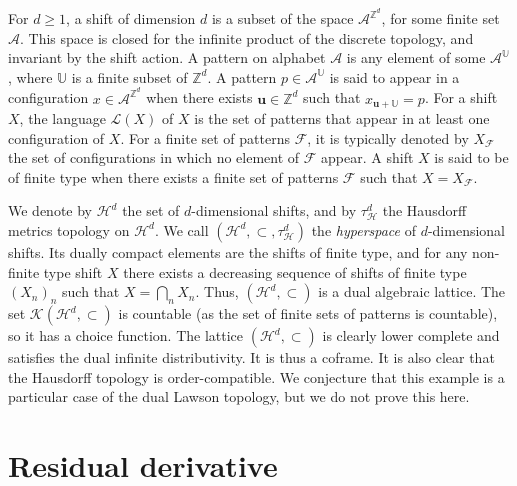 \documentclass{article}
\begin{document}
For $d \ge 1$, a shift of dimension $d$ is a subset of the space $\mathcal{A}^{\mathbb Z^d}$, for some finite set $\mathcal{A}$. This space is closed for the infinite product of the discrete topology, and invariant by the shift action. A pattern on alphabet $\mathcal{A}$ is any element of some $\mathcal{A}^{\mathbb U}$, where $\mathbb U$ is a finite subset of $\mathbb Z^d$. A pattern $p \in \mathcal{A}^{\mathbb U}$ is said to appear in a configuration $x \in \mathcal{A}^{\mathbb Z^d}$ when there exists $\textbf{u} \in \mathbb Z^d$ such that $x_{\textbf{u}+\mathbb U} = p$.
For a shift $X$, the language $\mathcal{L}(X)$ of $X$ is the set of patterns that appear in at least one configuration of $X$. 
For a finite set of patterns $\mathcal{F}$, it is typically denoted by $X_{\mathcal{F}}$ the set of configurations in which no element of $\mathcal{F}$ appear. A shift $X$ is said to be of finite type when there exists a finite set of patterns $\mathcal{F}$ such that $X = X_{\mathcal{F}}$.

We denote by $\mathcal{H}^d$ the set of $d$-dimensional shifts, and by $\tau^d_{\mathcal{H}}$ the Hausdorff metrics topology on $\mathcal{H}^d$. We call $(\mathcal{H}^d,\subset,\tau_{\mathcal{H}}^d)$ the \textit{hyperspace} of $d$-dimensional shifts. Its %
{dually compact} elements are the shifts of finite type, and for any non-finite type shift $X$ there exists a decreasing sequence of shifts of finite type $(X_n)_n$ such that $X = \bigcap_n X_n$. {Thus, \((\mathcal{H}^d,\subset)\) is a dual algebraic lattice}. The set $\mathcal{K}(\mathcal{H}^d,\subset)$ is countable (as the set of finite sets of patterns is countable), so it has a choice function. The lattice $(\mathcal{H}^d,\subset)$ is clearly 
lower complete {and satisfies the dual infinite distributivity}. It is thus a coframe. It is also clear that %
{the Hausdorff topology is order-compatible}. 
    We conjecture that this example is a particular case 
    of the dual Lawson topology, but we do not prove this here.

\section{\label{section.cb.defs}Residual derivative}
\end{document}
